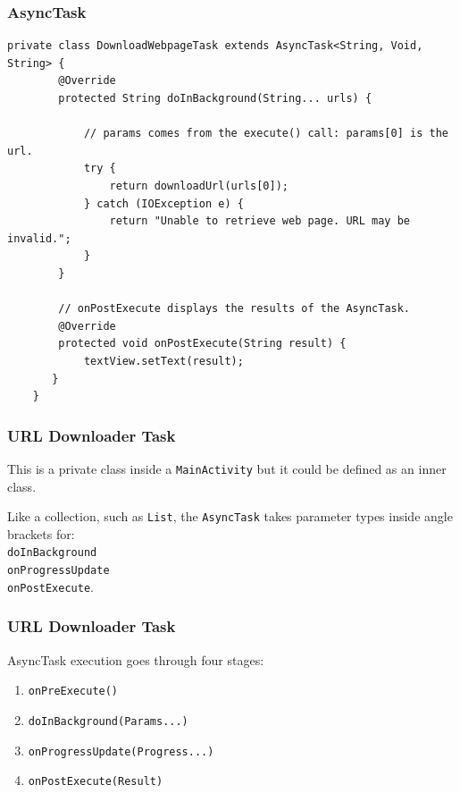 \begin{frame}[fragile]
\frametitle{AsyncTask}


{\scriptsize
\begin{verbatim}
private class DownloadWebpageTask extends AsyncTask<String, Void, String> {
        @Override
        protected String doInBackground(String... urls) {
              
            // params comes from the execute() call: params[0] is the url.
            try {
                return downloadUrl(urls[0]);
            } catch (IOException e) {
                return "Unable to retrieve web page. URL may be invalid.";
            }
        }
        
        // onPostExecute displays the results of the AsyncTask.
        @Override
        protected void onPostExecute(String result) {
            textView.setText(result);
       }
    }
\end{verbatim}
}
\end{frame}

\begin{frame}
\frametitle{URL Downloader Task}

\begin{changemargin}{1cm}
This is a private class inside a \texttt{MainActivity} but it could be defined as an inner class.

Like a collection, such as \texttt{List}, the \texttt{AsyncTask} takes parameter types inside angle brackets for:\\
\quad \texttt{doInBackground}\\
\quad \texttt{onProgressUpdate}\\
\quad \texttt{onPostExecute}.

\end{changemargin}
\end{frame}

\begin{frame}
\frametitle{URL Downloader Task}

\begin{changemargin}{1cm}
AsyncTask execution goes through four stages:

\begin{enumerate}
\item \texttt{onPreExecute()}
\item \texttt{doInBackground(Params...)}
\item \texttt{onProgressUpdate(Progress...)}
\item \texttt{onPostExecute(Result)}
\end{enumerate}

\end{changemargin}
\end{frame}


